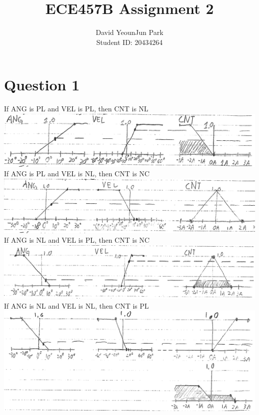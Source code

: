 \documentclass[12pt, letterpaper]{article}
\title{ECE457B Assignment 2}
\author{David YeounJun Park \\ Student ID: 20434264}
\begin{document}
\begin{titlepage}
\maketitle
\end{titlepage}

\section*{Question 1}
If ANG is PL and VEL is PL, then CNT is NL\\
\includegraphics[scale=0.5]{plplnl.png}\\
If ANG is PL and VEL is NL, then CNT is NC\\
\includegraphics[scale=0.5]{plnlnc.png}\\
If ANG is NL and VEL is PL, then CNT is NC\\
\includegraphics[scale=0.5]{nlplnc.png}\\
If ANG is NL and VEL is NL, then CNT is PL\\
\includegraphics[scale=0.5]{rest.png}\\
\end{document}
